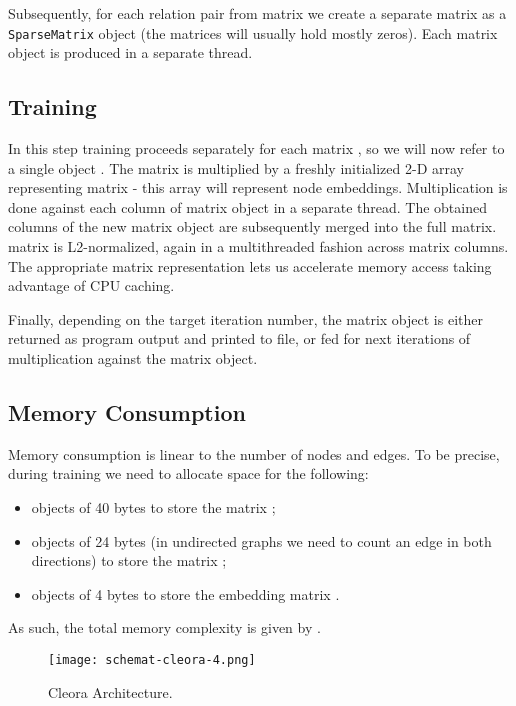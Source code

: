 \documentclass{IEEEtran}
\begin{document}
Subsequently, for each relation pair from matrix  we create a separate matrix  as a  \texttt{SparseMatrix} object (the matrices  will usually hold mostly zeros). Each matrix  object is produced in a separate thread.


\subsection{Training}
In this step training proceeds separately for each matrix , so we will now refer to a single object . The matrix  is multiplied by a freshly initialized 2-D array representing matrix  - this array will represent node embeddings. Multiplication is done against each column of matrix  object in a separate thread. The obtained columns of the new matrix  object are subsequently merged into the full matrix.  matrix is L2-normalized, again in a multithreaded fashion across matrix columns. The appropriate matrix representation lets us accelerate memory access taking advantage of CPU caching.

Finally, depending on the target iteration number, the  matrix object is either returned as program output and printed to file, or fed for next iterations of multiplication against the matrix  object.

\subsection{Memory Consumption}

Memory consumption is linear to the number of nodes and edges. To be precise, during training we need to allocate space for the following:

\begin{itemize}
    \item  objects of 40 bytes to store the matrix ;
    \item  objects of 24 bytes (in undirected graphs we need to count an edge in both directions) to store the matrix ;
    \item  objects of 4 bytes to store the embedding matrix .
\end{itemize}

As such, the total memory complexity is given by .
 
 \begin{figure*}\centering
\texttt{[image: schemat-cleora-4.png]}
\caption{Cleora Architecture.}
\label{fig_implementation}
\end{figure*}
 
\end{document}
